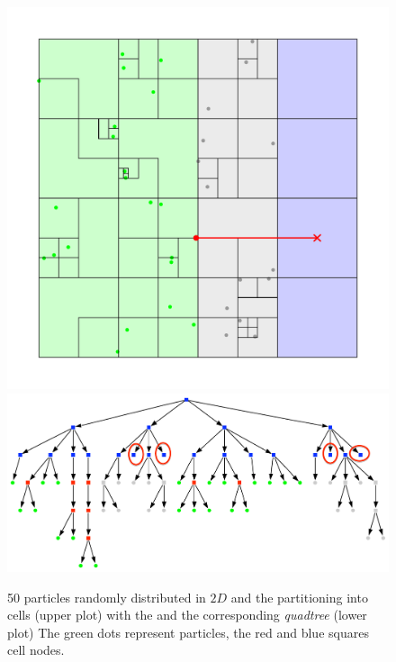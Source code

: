 \begin{figure}[htbp]
\begin{center}
\includegraphics[scale=0.6]{quadtree50_xy_TPL2.pdf}
\includegraphics[scale=0.6]{quadtree50_TPL2.pdf}
\caption{50 particles randomly distributed in $2D$ and the partitioning into cells (upper plot) with the and the corresponding \emph{quadtree} (lower plot) The green dots represent particles, the red and blue squares cell nodes.}
\label{fig:2D_BHtree}
\end{center}
\end{figure}


